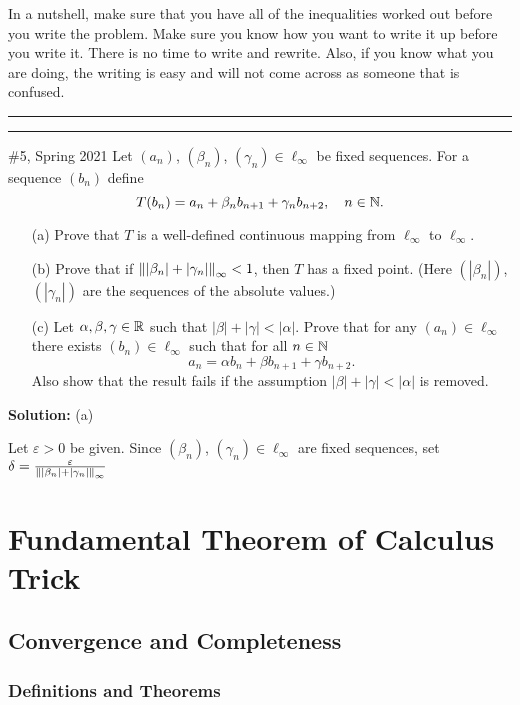 \documentclass{article}
\begin{document}
In a nutshell, make sure that you have all of the inequalities worked out before you write the problem. Make sure you know how you want to write it up before you write it. There is no time to write and rewrite. Also, if you know what you are doing, the writing is easy and will not come across as someone that is confused.\\

\hrule \vspace{2pt}
\hrule 

\break

\begin{problem}{\#5, Spring 2021} Let $(a_n)$, $(\beta_n)$, $(\gamma_n)\in \ell_\infty$ be fixed sequences. For a sequence $(b_n)$ define 
	\[ T(b_n) = a_n + \beta_n b_{n+1} + \gamma_n b_{n+2}, \quad n\in \mathbb N.\]
\begin{enumerate}
	\item[(a)] Prove that $T$ is a well-defined continuous mapping from $\ell_\infty$ to $\ell_\infty$.
	\item[(b)] Prove that if $\left\lVert {|\beta_n| + |\gamma_n|} \right\rVert_\infty < 1$, then $T$ has a fixed point. (Here $(|\beta_n|)$, 
			$(|\gamma_n|)$ are the sequences of the absolute values.)
	\item[(c)] Let $\alpha, \beta, \gamma\in\mathbb R$ such that $|\beta| + |\gamma| < |\alpha|$. Prove that for any $(a_n)\in \ell_\infty$
			there exists $(b_n)\in\ell_\infty$ such that for all $n\in \mathbb N$
				\[a_n = \alpha b_n + \beta b_{n+1} + \gamma b_{n+2}.\]
			Also show that the result fails if the assumption $|\beta| + |\gamma| < |\alpha|$ is removed. 
\end{enumerate}
\end{problem}

\textbf{Solution:} (a) 

Let $\varepsilon>0$ be given. Since $(\beta_n)$, $(\gamma_n)\in \ell_\infty$ are fixed sequences, set $\delta = \frac{\varepsilon}{\left\lVert {|\beta_n| + |\gamma_n|} \right\rVert_\infty}$


\break

\section{Fundamental Theorem of Calculus Trick}

\subsection{Convergence and Completeness}

\subsubsection{Definitions and Theorems}
\end{document}
